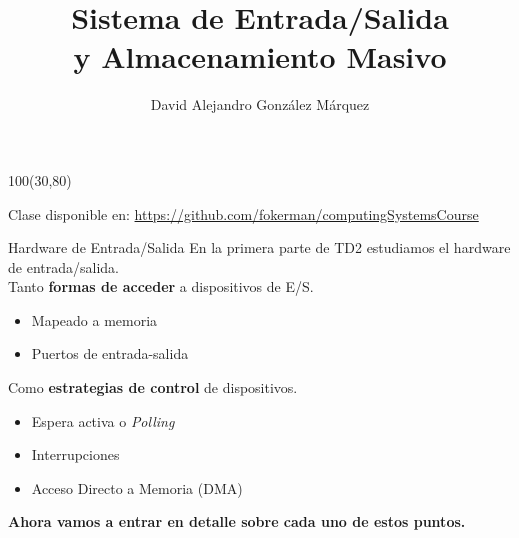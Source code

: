 \documentclass[aspectratio=169]{beamer}
\title{\Huge Sistema de Entrada/Salida\\ y Almacenamiento Masivo}
\author{David Alejandro González Márquez}
\date{}
\begin{document}
\begin{frame}[plain]
    \titlepage
    \begin{textblock}{100}(30,80)
    \begin{tcolorbox}[size=small,width=\textwidth,colback={gray!30},title={}]
    \begin{center}
     \scriptsize Clase disponible en: \url{https://github.com/fokerman/computingSystemsCourse}
    \end{center}
    \end{tcolorbox}
    \end{textblock}
\end{frame}

\begin{frame}{Hardware de Entrada/Salida}
    En la primera parte de TD2 estudiamos el hardware de entrada/salida.\\
    \bigskip
    Tanto \textcolor{verdeuca}{\textbf{formas de acceder}} a dispositivos de E/S.\\
    \begin{itemize}
    \item Mapeado a memoria
    \item Puertos de entrada-salida
    \end{itemize}
    \bigskip
    Como \textcolor{verdeuca}{\textbf{estrategias de control}} de dispositivos.\\
    \begin{itemize}
    \item Espera activa o \emph{Polling}
    \item Interrupciones
    \item Acceso Directo a Memoria (DMA)
    \end{itemize}
    \begin{center}
     \textcolor{naranjauca}{\textbf{Ahora vamos a entrar en detalle sobre cada uno de estos puntos.}}
    \end{center}
\end{frame}
    
\end{document}
